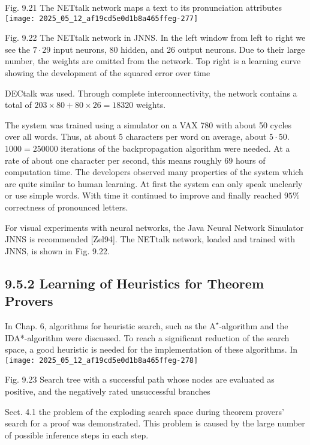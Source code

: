 \documentclass[10pt]{article}
\begin{document}
Fig. 9.21 The NETtalk network maps a text to its pronunciation attributes\\
\texttt{[image: 2025\_05\_12\_af19cd5e0d1b8a465ffeg-277]}

Fig. 9.22 The NETtalk network in JNNS. In the left window from left to right we see the $7 \cdot 29$ input neurons, 80 hidden, and 26 output neurons. Due to their large number, the weights are omitted from the network. Top right is a learning curve showing the development of the squared error over time

DECtalk was used. Through complete interconnectivity, the network contains a total of $203 \times 80+80 \times 26=18320$ weights.

The system was trained using a simulator on a VAX 780 with about 50 cycles over all words. Thus, at about 5 characters per word on average, about $5 \cdot 50$. $1000=250000$ iterations of the backpropagation algorithm were needed. At a rate of about one character per second, this means roughly 69 hours of computation time. The developers observed many properties of the system which are quite similar to human learning. At first the system can only speak unclearly or use simple words. With time it continued to improve and finally reached $95 \%$ correctness of pronounced letters.

For visual experiments with neural networks, the Java Neural Network Simulator JNNS is recommended [Zel94]. The NETtalk network, loaded and trained with JNNS, is shown in Fig. 9.22.

\subsection*{9.5.2 Learning of Heuristics for Theorem Provers}
In Chap. 6, algorithms for heuristic search, such as the $\mathrm{A}^{\star}$-algorithm and the IDA*-algorithm were discussed. To reach a significant reduction of the search space, a good heuristic is needed for the implementation of these algorithms. In\\
\texttt{[image: 2025\_05\_12\_af19cd5e0d1b8a465ffeg-278]}

Fig. 9.23 Search tree with a successful path whose nodes are evaluated as positive, and the negatively rated unsuccessful branches

Sect. 4.1 the problem of the exploding search space during theorem provers' search for a proof was demonstrated. This problem is caused by the large number of possible inference steps in each step.
\end{document}

